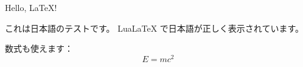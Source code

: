 \documentclass{article}
\begin{document}
Hello, \LaTeX!

これは日本語のテストです。  
LuaLaTeX で日本語が正しく表示されています。  

数式も使えます：
\[
E = mc^2
\]
\end{document}
